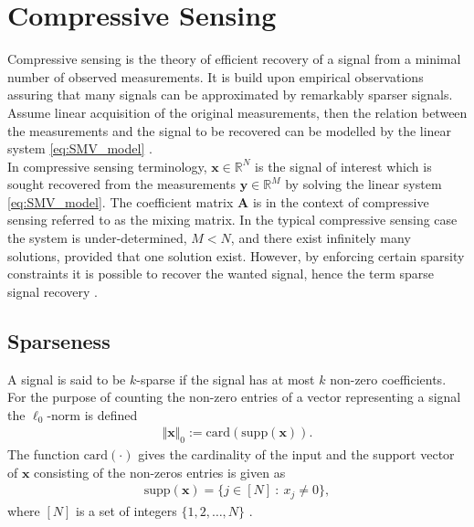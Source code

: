 \section{Compressive Sensing}\label{sec:CS}
Compressive sensing is the theory of efficient recovery of a signal from a minimal number of observed measurements. 
It is build upon empirical observations assuring that many signals can be approximated by remarkably sparser signals.   
Assume linear acquisition of the original measurements, then the relation between the measurements and the signal to be recovered can be modelled by the linear system \eqref{eq:SMV_model} \cite{FR}.  
\\ 
In compressive sensing terminology, $\mathbf{x} \in \mathbb{R}^N$ is the signal of interest which is sought recovered from the measurements $\mathbf{y} \in \mathbb{R}^M$ by solving the linear system \eqref{eq:SMV_model}. 
The coefficient matrix $\mathbf{A}$ is in the context of compressive sensing referred to as the mixing matrix.  
In the typical compressive sensing case the system is under-determined, $M < N$,  and there exist infinitely many solutions, provided that one solution exist.
However, by enforcing certain sparsity constraints it is possible to recover the wanted signal, hence the term sparse signal recovery \cite{FR}.

\subsection{Sparseness} 
A signal is said to be $k$-sparse if the signal has at most $k$ non-zero coefficients. 
For the purpose of counting the non-zero entries of a vector representing a signal the $\ell_0$-norm is defined
\begin{align*}
\Vert \mathbf{x} \Vert_0 := \text{card}(\text{supp}(\mathbf{x})).
\end{align*}
The function $\text{card}(\cdot)$ gives the cardinality of the input and the support vector of $\mathbf{x}$ consisting of the non-zeros entries is given as
\begin{align*}
\text{supp}(\mathbf{x}) = \{ j \in [N] \ : \ x_j \neq 0 \},
\end{align*} 
where $[N]$ is a set of integers $\lbrace 1, 2, \hdots, N \rbrace$ \cite[p. 41]{FR}. 

